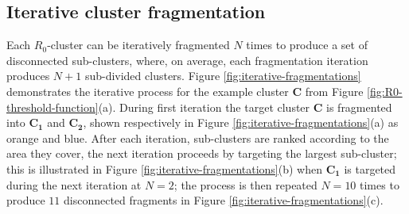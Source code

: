 
\subsection{Iterative cluster fragmentation}


Each $R_0$-cluster can be iteratively fragmented $N$ times to produce a set of disconnected sub-clusters, 
where, on average, each fragmentation iteration produces $N+1$ sub-divided clusters.
Figure \ref{fig:iterative-fragmentations} demonstrates the iterative process for the example cluster $\mathbf{C}$ from Figure \ref{fig:R0-threshold-function}(a).
During first iteration the target cluster $\mathbf{C}$ is fragmented into $\mathbf{C_1}$ and $\mathbf{C_2}$, shown respectively in Figure \ref{fig:iterative-fragmentations}(a) as orange and blue.
After each iteration, sub-clusters are ranked according to the area they cover, the next iteration proceeds by targeting the largest sub-cluster;
this is illustrated in Figure \ref{fig:iterative-fragmentations}(b) when $\mathbf{C_1}$ is targeted during the next iteration at $N=2$; the process is then repeated $N=10$ times to produce $11$ disconnected fragments in Figure \ref{fig:iterative-fragmentations}(c).

